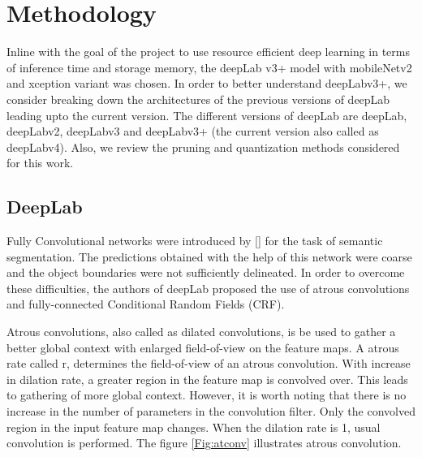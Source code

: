 \chapter{Methodology}

Inline with the goal of the project to use resource efficient deep learning in terms of inference time and storage memory, the deepLab v3+ model with mobileNetv2 and xception variant was chosen. In order to better understand deepLabv3+, we consider breaking down the architectures of the previous versions of deepLab leading upto the current version. The different versions of deepLab are deepLab, deepLabv2, deepLabv3 and deepLabv3+ (the current version also called as deepLabv4). Also, we review the pruning and quantization methods considered for this work.

\section{DeepLab}

Fully Convolutional networks were introduced by [] for the task of semantic segmentation. The predictions obtained with the help of this network were coarse and the object boundaries were not sufficiently delineated. In order to overcome these difficulties, the authors of deepLab proposed the use of atrous convolutions and fully-connected Conditional Random Fields (CRF).

Atrous convolutions, also called as dilated convolutions, is be used to gather a better global context with enlarged field-of-view on the feature maps. A atrous rate called r, determines the field-of-view of an atrous convolution. With increase in dilation rate, a greater region in the feature map is convolved over. This leads to gathering of more global context. However, it is worth noting that there is no increase in the number of parameters in the convolution filter. Only the convolved region in the input feature map changes. When the dilation rate is 1, usual convolution is performed. The figure \ref{Fig:atconv} illustrates atrous convolution. 

